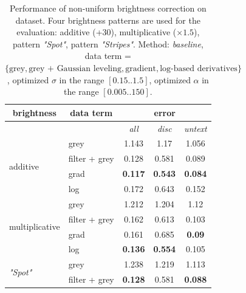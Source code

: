 \begin{table}[ht] \scriptsize
  \centering
  \caption{Performance of non-uniform brightness correction on \rub dataset. Four brightness patterns are used for the evaluation: additive (+30), multiplicative ($\times 1.5$), pattern \textit{"Spot"}, pattern \textit{"Stripes"}. Method: \textit{baseline}, data term = $\lbrace \text{grey}, \text{grey + Gaussian leveling}, \text{gradient}, \text{log-based derivatives}  \rbrace$, optimized $\sigma$ in the range $[0.15 .. 1.5]$, optimized $\alpha$ in the range $[0.005 .. 150]$. }
    \begin{tabular}{rrcrr}
    \toprule
    \multicolumn{1}{c}{brightness} & \multicolumn{1}{c}{data term} & \multicolumn{3}{c}{error} \\
    \midrule
          &       & \textit{all} & \multicolumn{1}{c}{\textit{disc}} & \multicolumn{1}{c}{\textit{untext}} \\
          \midrule   
          \midrule        
    \multicolumn{1}{l}{\multirow{4}[2]{*}{additive}} & \multicolumn{1}{l}{grey} & 1.143 & \multicolumn{1}{c}{1.17} & \multicolumn{1}{c}{1.056} \\
          & \multicolumn{1}{l}{filter + grey} & 0.128 & \multicolumn{1}{c}{0.581} & \multicolumn{1}{c}{0.089} \\
          & \multicolumn{1}{l}{grad} & \textbf{0.117} & \multicolumn{1}{c}{\textbf{0.543}} & \multicolumn{1}{c}{\textbf{0.084}} \\
          & \multicolumn{1}{l}{log} & 0.172 & \multicolumn{1}{c}{0.643} & \multicolumn{1}{c}{0.152} \\
          \midrule
    \multicolumn{1}{l}{\multirow{4}[2]{*}{multiplicative}} & \multicolumn{1}{l}{grey} & 1.212 & \multicolumn{1}{c}{1.204} & \multicolumn{1}{c}{1.12} \\
          & \multicolumn{1}{l}{filter + grey} & 0.162 & \multicolumn{1}{c}{0.613} & \multicolumn{1}{c}{0.103} \\
          & \multicolumn{1}{l}{grad} & 0.161 & \multicolumn{1}{c}{0.685} & \multicolumn{1}{c}{\textbf{0.09}} \\
          & \multicolumn{1}{l}{log} & \textbf{0.136} & \multicolumn{1}{c}{\textbf{0.554}} & \multicolumn{1}{c}{0.105} \\
          \midrule
    \multicolumn{1}{l}{\multirow{4}[2]{*}{\textit{"Spot"}}} & \multicolumn{1}{l}{grey} & 1.238 & \multicolumn{1}{c}{1.219} & \multicolumn{1}{c}{1.113} \\
          & \multicolumn{1}{l}{filter + grey} & \textbf{0.128} & \multicolumn{1}{c}{0.581} & \multicolumn{1}{c}{\textbf{0.088}} \\

\end{tabular}
\end{table}
